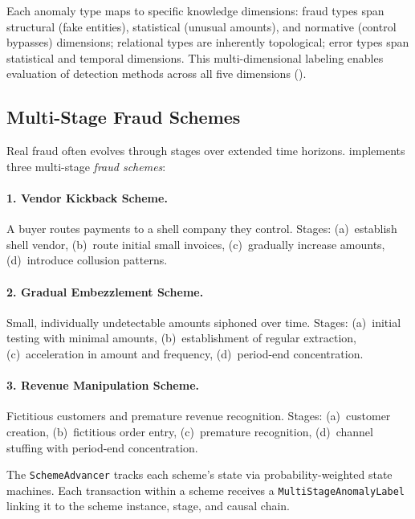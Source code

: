 Each anomaly type maps to specific knowledge dimensions: fraud types
span structural (fake entities), statistical (unusual amounts), and
normative (control bypasses) dimensions; relational types are inherently
topological; error types span statistical and temporal dimensions.  This
multi-dimensional labeling enables evaluation of detection methods across
all five dimensions ().

\subsection{Multi-Stage Fraud Schemes}
\label{sec:anom_schemes}

Real fraud often evolves through stages over extended time horizons.
\system{} implements three multi-stage \emph{fraud schemes}:

\paragraph{1. Vendor Kickback Scheme.}
A buyer routes payments to a shell company they control.  Stages:
(a)~establish shell vendor, (b)~route initial small invoices,
(c)~gradually increase amounts, (d)~introduce collusion patterns.

\paragraph{2. Gradual Embezzlement Scheme.}
Small, individually undetectable amounts siphoned over time.  Stages:
(a)~initial testing with minimal amounts, (b)~establishment of regular
extraction, (c)~acceleration in amount and frequency, (d)~period-end
concentration.

\paragraph{3. Revenue Manipulation Scheme.}
Fictitious customers and premature revenue recognition.  Stages:
(a)~customer creation, (b)~fictitious order entry, (c)~premature
recognition, (d)~channel stuffing with period-end concentration.

The \texttt{SchemeAdvancer} tracks each scheme's state via
probability-weighted state machines.  Each transaction within a scheme
receives a \texttt{MultiStageAnomalyLabel} linking it to the scheme
instance, stage, and causal chain.

